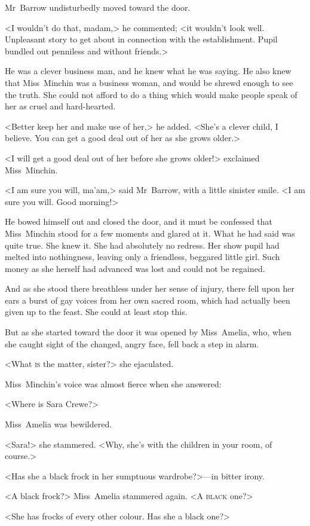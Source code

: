 Mr~Barrow undisturbedly moved toward the door.

<I wouldn't do that, madam,> he commented; <it wouldn't look well. Unpleasant story to get about in connection with the establishment. Pupil bundled out penniless and without friends.>

He was a clever business man, and he knew what he was saying. He also knew that Miss~Minchin was a business woman, and would be shrewd enough to see the truth. She could not afford to do a thing which would make people speak of her as cruel and hard-hearted.

<Better keep her and make use of her,> he added. <She's a clever child, I believe. You can get a good deal out of her as she grows older.>

<I will get a good deal out of her before she grows older!> exclaimed Miss~Minchin.

<I am sure you will, ma'am,> said Mr~Barrow, with a little sinister smile. <I am sure you will. Good morning!>

He bowed himself out and closed the door, and it must be confessed that Miss~Minchin stood for a few moments and glared at it. What he had said was quite true. She knew it. She had absolutely no redress. Her show pupil had melted into nothingness, leaving only a friendless, beggared little girl. Such money as she herself had advanced was lost and could not be regained.

And as she stood there breathless under her sense of injury, there fell upon her ears a burst of gay voices from her own sacred room, which had actually been given up to the feast. She could at least stop this.

But as she started toward the door it was opened by Miss~Amelia, who, when she caught sight of the changed, angry face, fell back a step in alarm.

<What \textsc{is} the matter, sister?> she ejaculated.

Miss~Minchin's voice was almost fierce when she answered:

<Where is Sara Crewe?>

Miss~Amelia was bewildered.

<Sara!> she stammered. <Why, she's with the children in your room, of course.>

<Has she a black frock in her sumptuous wardrobe?>—in bitter irony.

<A black frock?> Miss~Amelia stammered again. <A \textsc{black} one?>

<She has frocks of every other colour. Has she a black one?>

